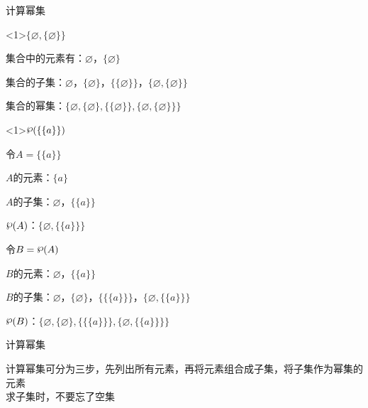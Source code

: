 \documentclass[xetex,10pt,aspectratio=43]{beamer}
\newcommand{\powerset}{\raisebox{.15\baselineskip}{\ensuremath{\wp}}}
\begin{document}
	\begin{frame}{计算幂集}
	
	\begin{block}{$\{\varnothing,\{\varnothing\}\}$}
		
		集合中的元素有：$\varnothing$，$\{\varnothing\}$
		
		集合的子集：$\varnothing$，$\{\varnothing\}$，$\{\{\varnothing\}\}$，$\{\varnothing,\{\varnothing\}\}$
		
		集合的幂集：$\{\varnothing,\{\varnothing\},\{\{\varnothing\}\},\{\varnothing,\{\varnothing\}\}\}$
		
	\end{block}

	\begin{block}{$\powerset(\{\{a\}\})$}
		
		令$A=\{\{a\}\}$
		
		$A$的元素：$\{a\}$
		
		$A$的子集：$\varnothing$，$\{\{a\}\}$
		
		$\powerset(A)$：$\{\varnothing,\{\{a\}\}\}$
		
		令$B=\powerset(A)$
		
		$B$的元素：$\varnothing$，$\{\{a\}\}$
		
		$B$的子集：$\varnothing$，$\{\varnothing\}$，$\{\{\{a\}\}\}$，$\{\varnothing,\{\{a\}\}\}$
		
		$\powerset(B)$：$\{\varnothing,\{\varnothing\},\{\{\{a\}\}\},\{\varnothing,\{\{a\}\}\}\}$
	\end{block}
			
	\end{frame}

	\begin{frame}{计算幂集}
			
		\textcolor{mymauve}{计算幂集可分为三步，先列出所有元素，再将元素组合成子集，将子集作为幂集的元素\\
		求子集时，不要忘了空集}
	
	\end{frame}
\end{document}
